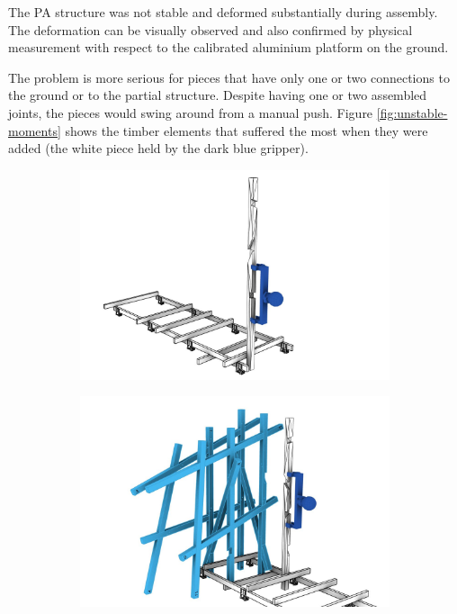 The PA structure was not stable and deformed substantially during assembly. The deformation can be visually observed and also confirmed by physical measurement with respect to the calibrated aluminium platform on the ground.

The problem is more serious for pieces that have only one or two connections to the ground or to the partial structure. Despite having one or two assembled joints, the pieces would swing around from a manual push. Figure \ref{fig:unstable-moments} shows the timber elements that suffered the most when they were added (the white piece held by the dark blue gripper). 

\begin{figure}[!h]
    \centering
    \begin{subfigure}[b]{0.49\textwidth}
        \centering
        \includegraphics[width=\textwidth]{images/05/image53.jpg}
    \end{subfigure}
    \hfill
    \begin{subfigure}[b]{0.49\textwidth}
        \centering
        \includegraphics[width=\textwidth]{images/05/image91.jpg}

\end{subfigure}
\end{figure}
